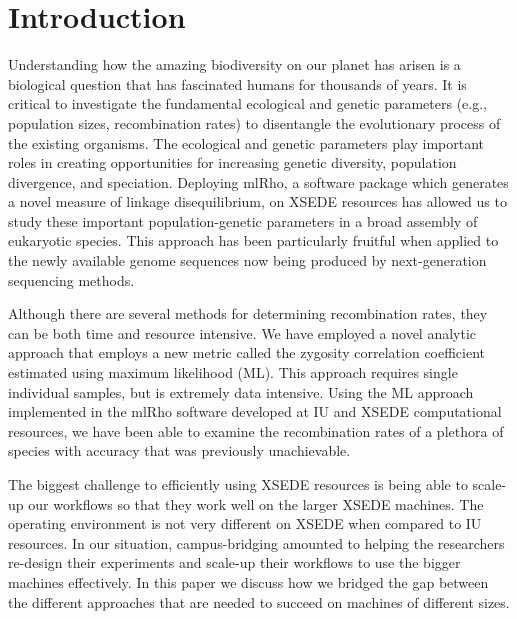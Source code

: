 \documentclass{sig-alternate}
\begin{document}
\section{Introduction}
Understanding how the amazing biodiversity on our planet has arisen is a biological question that has
fascinated humans for thousands of years. It is critical to investigate the fundamental ecological and genetic
parameters (e.g., population sizes, recombination rates) to disentangle the evolutionary process of the
existing organisms. The ecological and genetic parameters play important roles in creating opportunities for
increasing genetic diversity, population divergence, and speciation. Deploying mlRho, a software package which
generates a novel measure of linkage disequilibrium, on XSEDE resources has allowed us to study these
important population-genetic parameters in a broad assembly of eukaryotic species. This approach has been
particularly fruitful when applied to the newly available genome sequences now being produced by
next-generation sequencing methods.

Although there are several methods for determining recombination rates, they can be both time and resource
intensive. We have employed a novel analytic approach that employs a new metric called the zygosity
correlation coefficient estimated using maximum likelihood (ML). This approach requires single individual
samples, but is extremely data intensive. Using the ML approach implemented in the mlRho software developed at
IU and XSEDE computational resources, we have been able to examine the recombination rates of a plethora of
species with accuracy that was previously unachievable.

The biggest challenge to efficiently using XSEDE resources is being able to scale-up our workflows so that they work well on the larger XSEDE machines. The operating environment is not very different on XSEDE when compared to IU resources. In our situation, campus-bridging amounted to helping the researchers re-design their experiments and scale-up their workflows to use the bigger machines effectively. In this paper we discuss how we bridged the gap between the different approaches that are needed to succeed on machines of different sizes. 
\end{document}
